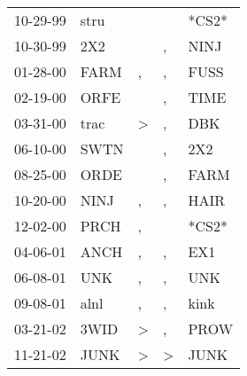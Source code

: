 \begin{supertabular}{p{0.07\textwidth}p{0.06\textwidth}p{0.02\textwidth}p{0.02\textwidth}p{0.06\textwidth}}
          10-29-99\textsuperscript{} &           stru\textsuperscript{} &               &                  &                   *CS2* \\
          10-30-99\textsuperscript{} &            2X2\textsuperscript{} &               &                , &  NINJ\textsuperscript{} \\
          01-28-00\textsuperscript{} &           FARM\textsuperscript{} &             , &                , &  FUSS\textsuperscript{} \\
          02-19-00\textsuperscript{} &           ORFE\textsuperscript{} &               &                , &  TIME\textsuperscript{} \\
          03-31-00\textsuperscript{} &           trac\textsuperscript{} &  \textgreater &                , &   DBK\textsuperscript{} \\
          06-10-00\textsuperscript{} &           SWTN\textsuperscript{} &               &                , &   2X2\textsuperscript{} \\
          08-25-00\textsuperscript{} &           ORDE\textsuperscript{} &               &                , &  FARM\textsuperscript{} \\
          10-20-00\textsuperscript{} &           NINJ\textsuperscript{} &             , &                , &  HAIR\textsuperscript{} \\
          12-02-00\textsuperscript{} &           PRCH\textsuperscript{} &             , &                  &                   *CS2* \\
          04-06-01\textsuperscript{} &           ANCH\textsuperscript{} &             , &                , &   EX1\textsuperscript{} \\
          06-08-01\textsuperscript{} &            UNK\textsuperscript{} &             , &                , &   UNK\textsuperscript{} \\
          09-08-01\textsuperscript{} &           alnl\textsuperscript{} &             , &                , &  kink\textsuperscript{} \\
          03-21-02\textsuperscript{} &           3WID\textsuperscript{} &  \textgreater &                , &  PROW\textsuperscript{} \\
          11-21-02\textsuperscript{} &           JUNK\textsuperscript{} &  \textgreater &     \textgreater &  JUNK\textsuperscript{} \\

\end{supertabular}

